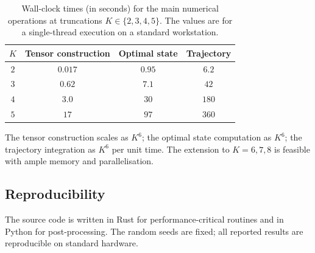 \begin{table}[h]
\centering
\caption{Wall-clock times (in seconds) for the main numerical 
operations at truncations $K\in\{2,3,4,5\}$. The values are for a 
single-thread execution on a standard workstation.}
\label{tab:D-perf}
\begin{tabular}{cccc}
\toprule
$K$ & Tensor construction & Optimal state & Trajectory \\
\midrule
$2$ & $0.017$ & $0.95$ & $6.2$ \\
$3$ & $0.62$ & $7.1$ & $42$ \\
$4$ & $3.0$ & $30$ & $180$ \\
$5$ & $17$ & $97$ & $360$ \\
\bottomrule
\end{tabular}
\end{table}

\begin{remark}[Scaling]\label{rem:scaling-perf}
The tensor construction scales as $K^6$; the optimal state 
computation as $K^6$; the trajectory integration as $K^6$ per unit 
time. The extension to $K=6,7,8$ is feasible with ample memory and 
parallelisation.
\end{remark}

\subsection{Reproducibility}
\label{ssec:D-repro}

The source code is written in Rust for performance-critical routines 
and in Python for post-processing. The random seeds are fixed; all 
reported results are reproducible on standard hardware.
